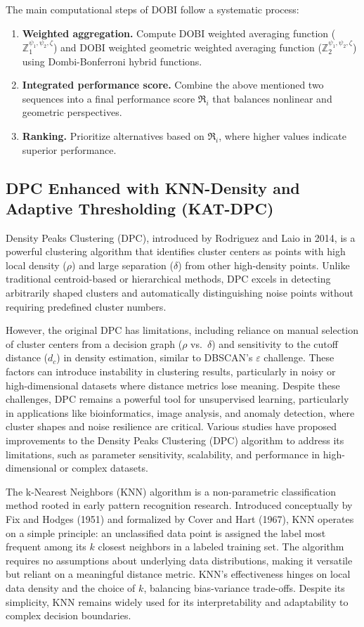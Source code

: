 \documentclass{article}
\begin{document}
The main computational steps of DOBI follow a systematic process:
\begin{enumerate}[label=\alph*)]
\item \textbf{Weighted aggregation.} Compute DOBI weighted averaging function ($\mathbb{Z}_{1}^{\psi_{1},\psi_{2},\zeta}$) and DOBI weighted geometric weighted averaging function ($\mathbb{Z}_{2}^{\psi_{1},\psi_{2},\zeta}$) using Dombi-Bonferroni hybrid functions.
\item \textbf{Integrated performance score.} Combine the above mentioned two sequences into a final performance score $\mathfrak{R}_{i}$ that balances nonlinear and geometric perspectives.
\item \textbf{Ranking.} Prioritize alternatives based on $\mathfrak{R}_{i}$, where higher values indicate superior performance.
\end{enumerate}

\subsection{DPC Enhanced with KNN-Density and Adaptive Thresholding (KAT-DPC)}
Density Peaks Clustering (DPC), introduced by Rodriguez and Laio in 2014, is a powerful clustering algorithm that identifies cluster centers as points with high local density ($\rho$) and large separation ($\delta$) from other high-density points. Unlike traditional centroid-based or hierarchical methods, DPC excels in detecting arbitrarily shaped clusters and automatically distinguishing noise points without requiring predefined cluster numbers.

However, the original DPC has limitations, including reliance on manual selection of cluster centers from a decision graph ($\rho$ vs.\ $\delta$) and sensitivity to the cutoff distance ($d_{c}$) in density estimation, similar to DBSCAN's $\varepsilon$ challenge. These factors can introduce instability in clustering results, particularly in noisy or high-dimensional datasets where distance metrics lose meaning. Despite these challenges, DPC remains a powerful tool for unsupervised learning, particularly in applications like bioinformatics, image analysis, and anomaly detection, where cluster shapes and noise resilience are critical. Various studies have proposed improvements to the Density Peaks Clustering (DPC) algorithm to address its limitations, such as parameter sensitivity, scalability, and performance in high-dimensional or complex datasets.

The k-Nearest Neighbors (KNN) algorithm is a non-parametric classification method rooted in early pattern recognition research. Introduced conceptually by Fix and Hodges (1951) and formalized by Cover and Hart (1967), KNN operates on a simple principle: an unclassified data point is assigned the label most frequent among its $k$ closest neighbors in a labeled training set. The algorithm requires no assumptions about underlying data distributions, making it versatile but reliant on a meaningful distance metric. KNN's effectiveness hinges on local data density and the choice of $k$, balancing bias-variance trade-offs. Despite its simplicity, KNN remains widely used for its interpretability and adaptability to complex decision boundaries.
\end{document}
